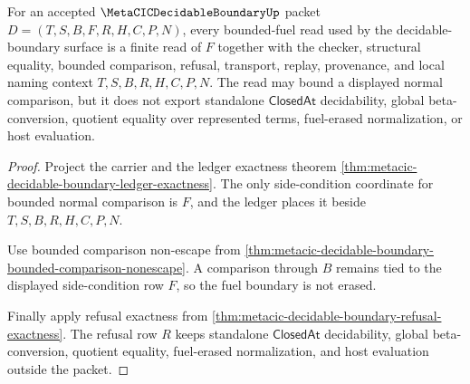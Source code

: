 \begin{theorem}
\label{thm:metacic-decidable-boundary-fuel-obligation}
For an accepted $\MetaCICDecidableBoundaryUp$ packet $D=(T,S,B,F,R,H,C,P,N)$, every bounded-fuel read used by the decidable-boundary surface is a finite read of $F$ together with the checker, structural equality, bounded comparison, refusal, transport, replay, provenance, and local naming context $T,S,B,R,H,C,P,N$. The read may bound a displayed normal comparison, but it does not export standalone $\mathsf{ClosedAt}$ decidability, global beta-conversion, quotient equality over represented terms, fuel-erased normalization, or host evaluation.
\end{theorem}
\begin{proof}
Project the carrier and the ledger exactness theorem \autoref{thm:metacic-decidable-boundary-ledger-exactness}. The only side-condition coordinate for bounded normal comparison is $F$, and the ledger places it beside $T,S,B,R,H,C,P,N$.

Use bounded comparison non-escape from \autoref{thm:metacic-decidable-boundary-bounded-comparison-nonescape}. A comparison through $B$ remains tied to the displayed side-condition row $F$, so the fuel boundary is not erased.

Finally apply refusal exactness from \autoref{thm:metacic-decidable-boundary-refusal-exactness}. The refusal row $R$ keeps standalone $\mathsf{ClosedAt}$ decidability, global beta-conversion, quotient equality, fuel-erased normalization, and host evaluation outside the packet.
\end{proof}

